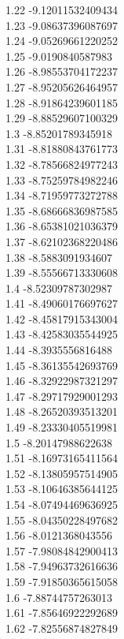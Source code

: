 {1.22	-9.12011532409434\\
1.23	-9.08637396087697\\
1.24	-9.05269661220252\\
1.25	-9.0190840587983\\
1.26	-8.98553704172237\\
1.27	-8.95205626464957\\
1.28	-8.91864239601185\\
1.29	-8.88529607100329\\
1.3	-8.85201789345918\\
1.31	-8.81880843761773\\
1.32	-8.78566824977243\\
1.33	-8.75259784982246\\
1.34	-8.71959773272788\\
1.35	-8.68666836987585\\
1.36	-8.65381021036379\\
1.37	-8.62102368220486\\
1.38	-8.5883091934607\\
1.39	-8.55566713330608\\
1.4	-8.52309787302987\\
1.41	-8.49060176697627\\
1.42	-8.45817915343004\\
1.43	-8.42583035544925\\
1.44	-8.3935556816488\\
1.45	-8.36135542693769\\
1.46	-8.32922987321297\\
1.47	-8.29717929001293\\
1.48	-8.26520393513201\\
1.49	-8.23330405519981\\
1.5	-8.20147988622638\\
1.51	-8.16973165411564\\
1.52	-8.13805957514905\\
1.53	-8.10646385644125\\
1.54	-8.07494469636925\\
1.55	-8.04350228497682\\
1.56	-8.0121368043556\\
1.57	-7.98084842900413\\
1.58	-7.94963732616636\\
1.59	-7.91850365615058\\
1.6	-7.88744757263013\\
1.61	-7.85646922292689\\
1.62	-7.82556874827849\\
}
